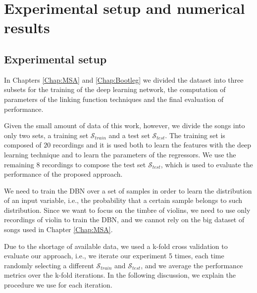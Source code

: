 \section{Experimental setup and numerical results}\label{sec:Violin:results}

\subsection{Experimental setup}\label{sec:Violin:setup}

In Chapters \ref{Chap:MSA} and \ref{Chap:Bootleg} we divided the dataset into three subsets for the training of the deep learning network, the computation of parameters of the linking function techniques and the final evaluation of performance. 

Given the small amount of data of this work, however, we divide the songs into only two sets, a training set $\mathcal{S}_{train}$ and a test set $\mathcal{S}_{test}$. The training set is composed of $20$ recordings and it is used both to learn the features with the deep learning technique and to learn the parameters of the regressors. We use the remaining $8$ recordings to compose the test set $\mathcal{S}_{test}$, which is used to evaluate the performance of the proposed approach.  

We need to train the DBN over a set of samples in order to learn the distribution of an input variable, i.e., the probability that a certain sample belongs to such distribution. Since we want to focus on the timbre of violins, we need to use only recordings of violin to train the DBN, and we cannot rely on the big dataset of songs used in Chapter \ref{Chap:MSA}. 

Due to the shortage of available data, we used a k-fold cross validation  to evaluate our approach, i.e., we iterate our experiment 5 times, each time randomly selecting a different $\mathcal{S}_{train}$ and $\mathcal{S}_{test}$, and we average the performance metrics over the k-fold iterations. In the following discussion, we explain the procedure we use for each iteration.


